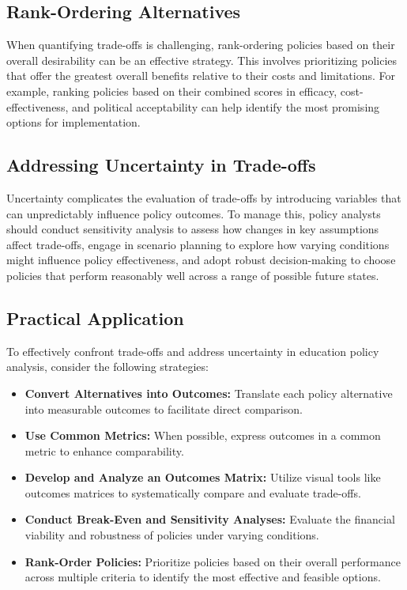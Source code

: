 \documentclass{article}
\theoremstyle{definition}
\theoremstyle{plain}
\begin{document}
\subsection{Rank-Ordering Alternatives}

When quantifying trade-offs is challenging, rank-ordering policies based on their overall desirability can be an effective strategy. This involves prioritizing policies that offer the greatest overall benefits relative to their costs and limitations. For example, ranking policies based on their combined scores in efficacy, cost-effectiveness, and political acceptability can help identify the most promising options for implementation.

\subsection{Addressing Uncertainty in Trade-offs}

Uncertainty complicates the evaluation of trade-offs by introducing variables that can unpredictably influence policy outcomes. To manage this, policy analysts should conduct sensitivity analysis to assess how changes in key assumptions affect trade-offs, engage in scenario planning to explore how varying conditions might influence policy effectiveness, and adopt robust decision-making to choose policies that perform reasonably well across a range of possible future states.

\subsection{Practical Application}

To effectively confront trade-offs and address uncertainty in education policy analysis, consider the following strategies:

\begin{itemize}
    \item \textbf{Convert Alternatives into Outcomes:} Translate each policy alternative into measurable outcomes to facilitate direct comparison.
    \item \textbf{Use Common Metrics:} When possible, express outcomes in a common metric to enhance comparability.
    \item \textbf{Develop and Analyze an Outcomes Matrix:} Utilize visual tools like outcomes matrices to systematically compare and evaluate trade-offs.
    \item \textbf{Conduct Break-Even and Sensitivity Analyses:} Evaluate the financial viability and robustness of policies under varying conditions.
    \item \textbf{Rank-Order Policies:} Prioritize policies based on their overall performance across multiple criteria to identify the most effective and feasible options.
\end{itemize}
\end{document}
